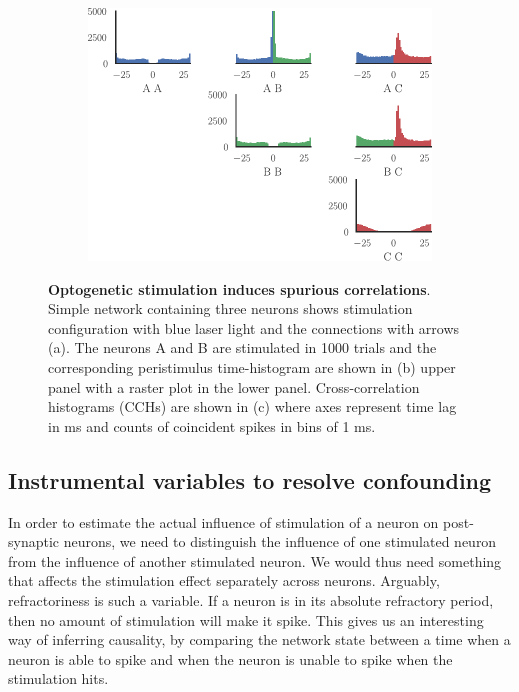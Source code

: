 \documentclass[11pt]{article}
\begin{document}
\begin{figure}
\begin{subfigure}{\textwidth}\centering \includegraphics[scale=1]{xcorr}
\caption{} \label{fig:intro:3}
\end{subfigure}
\caption{{\bf Optogenetic stimulation induces spurious correlations}. 
Simple network containing three neurons shows stimulation configuration with blue laser light and the connections with arrows (a). 
The neurons A and B are stimulated in 1000 trials and the corresponding peristimulus time-histogram are shown in (b) upper panel with a raster plot in the lower panel. 
Cross-correlation histograms (CCHs) are shown in (c) where axes represent time lag in ms and counts of coincident spikes in bins of 1 ms.}
\label{fig:intro}
\end{figure}

\FloatBarrier
\subsection{Instrumental variables to resolve confounding}
In order to estimate the actual influence of stimulation of a neuron on post-synaptic neurons, we need to distinguish the influence of one stimulated neuron from the influence of another stimulated neuron. 
We would thus need something that affects the stimulation effect separately across neurons. 
Arguably, refractoriness is such a variable. 
If a neuron is in its absolute refractory period, then no amount of stimulation will make it spike. 
This gives us an interesting way of inferring causality, by comparing the network state between a time when a neuron is able to spike and when the neuron is unable to spike when the stimulation hits.
\end{document}

